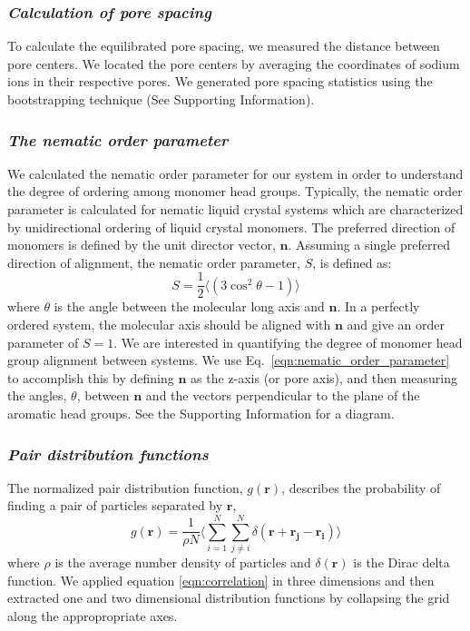 \documentclass[journal=jpcbfk,manusciprt=article]{achemso}
\begin{document}
  \subsubsection{\textit{Calculation of pore spacing}}

  To calculate the equilibrated pore spacing, we measured the distance between
  pore centers. We located the pore centers by averaging the coordinates of sodium
  ions in their respective pores. We generated pore spacing statistics 
  using the bootstrapping technique (See Supporting Information).

  \subsubsection{\textit{The nematic order parameter}}

  We calculated the nematic order parameter for our system in order to
  understand the degree of ordering among monomer head groups. Typically, the
  nematic order parameter is calculated for nematic liquid crystal systems which
  are characterized by unidirectional ordering of liquid crystal monomers. The
  preferred direction of monomers is defined by the unit director vector,
  $\mathbf{n}$. Assuming a single preferred direction of alignment, the nematic
  order parameter, $S$, is defined as:
  \begin{equation}
	 S = \frac{1}{2} \langle(3\cos^2\theta -1)\rangle
	\label{eqn:nematic_order_parameter}
  \end{equation}
  where $\theta$ is the angle between the molecular long axis and $\mathbf{n}$.
  In a perfectly ordered system, the molecular axis should be aligned with
  $\mathbf{n}$ and give an order parameter of $S=1$. We are interested in
  quantifying the degree of monomer head group alignment between systems. We use
  Eq.~\ref{eqn:nematic_order_parameter} to accomplish this by defining
  $\mathbf{n}$ as the z-axis (or pore axis), and then measuring the angles,
  $\theta$, between $\mathbf{n}$ and the vectors perpendicular to the plane of
  the aromatic head groups. See the Supporting Information for a diagram.  
  
  \subsubsection{\textit{Pair distribution functions}}

  The normalized pair distribution function, $g(\mathbf{r})$, describes
  the probability of finding a pair of particles separated by $\mathbf{r}$,
  \begin{equation}
	g(\mathbf{r})= \frac{1}{\rho N} \Bigg \langle \sum_{i=1}^{N}\sum_{j\neq i}^{N} \delta(\mathbf{r}+\mathbf{r_j}-\mathbf{r_i}) \Bigg \rangle
	\label{eqn:correlation}
  \end{equation}
  where $\rho$ is the average number density of particles and
  $\delta(\mathbf{r})$ is the Dirac delta function\cite{kuriabova_linear_2010}.
  We applied equation \ref{eqn:correlation} in three dimensions and then
  extracted one and two dimensional distribution functions by collapsing the grid
  along the appropropriate axes.
\end{document}
